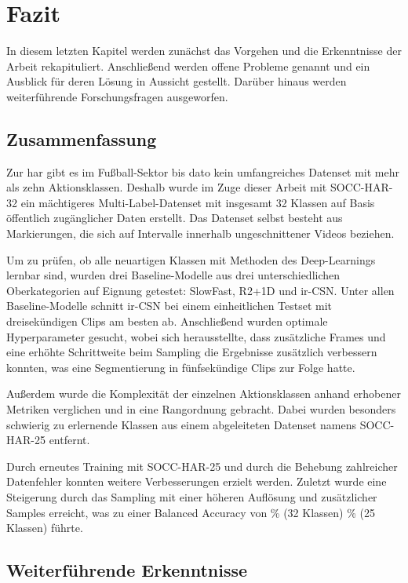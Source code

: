 \chapter{Fazit}
\label{ch:zusammenfassung}

In diesem letzten Kapitel werden zunächst das Vorgehen und die Erkenntnisse der Arbeit rekapituliert.
Anschließend werden offene Probleme genannt und ein Ausblick für deren Lösung in Aussicht gestellt.
Darüber hinaus werden weiterführende Forschungsfragen ausgeworfen.

\section{Zusammenfassung}
\label{sec:rekapitulation}

Zur \gls{har} gibt es im Fußball-Sektor bis dato kein umfangreiches Datenset mit mehr als zehn Aktionsklassen.
Deshalb wurde im Zuge dieser Arbeit mit SOCC-HAR-32 ein mächtigeres Multi-Label-Datenset mit insgesamt 32 Klassen auf Basis öffentlich zugänglicher Daten erstellt.
Das Datenset selbst besteht aus Markierungen, die sich auf Intervalle innerhalb ungeschnittener Videos beziehen.

Um zu prüfen, ob alle neuartigen Klassen mit Methoden des Deep-Learnings lernbar sind, wurden drei Baseline-Modelle aus drei unterschiedlichen Oberkategorien auf Eignung getestet:
SlowFast, R2+1D und ir-CSN.
Unter allen Baseline-Modelle schnitt ir-CSN bei einem einheitlichen Testset mit dreisekündigen Clips am besten ab.
Anschließend wurden optimale Hyperparameter gesucht, wobei sich herausstellte, dass zusätzliche Frames und eine erhöhte Schrittweite beim Sampling die Ergebnisse zusätzlich verbessern konnten, was eine Segmentierung in fünfsekündige Clips zur Folge hatte.

Außerdem wurde die Komplexität der einzelnen Aktionsklassen anhand erhobener Metriken verglichen und in eine Rangordnung gebracht.
Dabei wurden besonders schwierig zu erlernende Klassen aus einem abgeleiteten Datenset namens SOCC-HAR-25 entfernt.

Durch erneutes Training mit SOCC-HAR-25 und durch die Behebung zahlreicher Datenfehler konnten weitere Verbesserungen erzielt werden.
Zuletzt wurde eine Steigerung durch das Sampling mit einer höheren Auflösung und zusätzlicher Samples erreicht, was zu einer Balanced Accuracy von \primarymetric \% (32 Klassen) \bzw \secondarymetric \% (25 Klassen) führte.

\section{Weiterführende Erkenntnisse}
\label{sec:weiterfuhrende-erkenntnisse}

